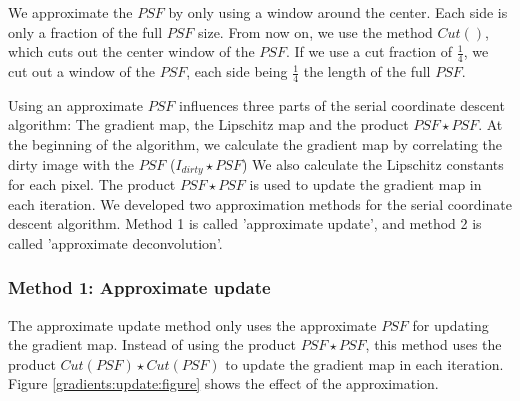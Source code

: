 We approximate the $PSF$ by only using a window around the center. Each side is only a fraction of the full $PSF$ size. From now on, we use the method $Cut()$, which cuts out the center window of the $PSF$. If we use a cut fraction of $\frac{1}{4}$, we cut out a window of the $PSF$, each side being  $\frac{1}{4}$ the length of the full $PSF$.

Using an approximate $PSF$ influences three parts of the serial coordinate descent algorithm: The gradient map, the Lipschitz map and the product $PSF \star PSF$. At the beginning of the algorithm, we calculate the gradient map by correlating the dirty image with the $PSF$ ($I_{dirty} \star PSF$) We also calculate the Lipschitz constants for each pixel. The product $PSF \star PSF$ is used to update the gradient map in each iteration. We developed two approximation methods for the serial coordinate descent algorithm. Method 1 is called 'approximate update', and method 2 is called 'approximate deconvolution'.

\subsubsection{Method 1: Approximate update} \label{gradients:methods:update}
The approximate update method only uses the approximate $PSF$ for updating the gradient map. Instead of using the product $PSF \star PSF$, this method uses the product $Cut(PSF) \star Cut(PSF)$ to update the gradient map in each iteration. Figure \ref{gradients:update:figure} shows the effect of the approximation.  

